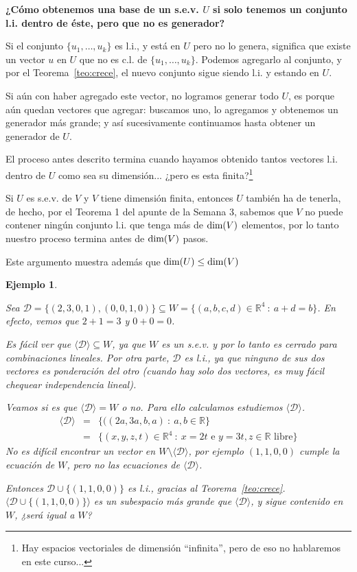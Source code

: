 \documentclass[12pt]{book}
\newtheorem{ejem}{Ejemplo}
\def\R{\mathbb{R}}
\def\D{\mathcal{D}}
\def\dim{\textup{dim}}
\begin{document}
\vspace{.2cm}

{\bf ¿Cómo obtenemos una base de un s.e.v. $U$ si solo tenemos un conjunto l.i. dentro de éste, pero que no es generador?}

Si el conjunto $\{u_1,\dots,u_k\}$ es l.i., y está en $U$ pero no lo genera, significa que existe un vector $u$ en $U$ que no es c.l. de $\{u_1,\dots,u_k\}$.
Podemos agregarlo al conjunto, y por el Teorema~\ref{teo:crece}, el nuevo conjunto sigue siendo l.i. y estando en $U$.

Si aún con haber agregado este vector, no logramos generar todo $U$, es porque aún quedan vectores que agregar: buscamos uno, lo agregamos y obtenemos un generador más grande; y así sucesivamente continuamos hasta obtener un generador de $U$.

El proceso antes descrito termina cuando hayamos obtenido tantos vectores l.i. dentro de $U$ como sea su dimensión... ¿pero es esta finita?\footnote{Hay espacios vectoriales de dimensión ``infinita'', pero de eso no hablaremos en este curso...}

Si $U$ es s.e.v. de $V$ y $V$ tiene dimensión finita, entonces $U$ también ha de tenerla, de hecho, por el Teorema 1 del apunte de la Semana 3, sabemos que $V$ no puede contener ningún conjunto l.i. que tenga más de $\dim(V)$ elementos, por lo tanto nuestro proceso termina antes de $\dim(V)$ pasos.

Este argumento muestra además que $\dim(U)\le\dim(V)$


\begin{ejem}\label{ejem:+1} {\em
  Sea $\D=\{(2,3,0,1),(0,0,1,0)\}\subseteq W=\{(a,b,c,d)\in\R^4\ :\ a+d=b\}$. 
  En efecto, vemos que $2+1=3$ y $0+0=0$.
  
  Es fácil ver que $\langle\D\rangle \subseteq W$, ya que $W$ es un s.e.v. y por lo tanto es cerrado para combinaciones lineales.
  Por otra parte, $\D$ es l.i., ya que ninguno de sus dos vectores es ponderación del otro (cuando hay solo dos vectores, es muy fácil chequear independencia lineal).
  
  Veamos si es que $\langle \D\rangle = W$ o no.
  Para ello calculamos estudiemos $\langle \D\rangle$.
  \begin{eqnarray*}
    \langle\D\rangle&=&\{((2a,3a,b,a)\ :\ a,b\in\R\}\\
    &=& \{(x,y,z,t)\in\R^4\ : \ x=2t\textrm{ e } y=3t, z\in \R \textrm{ libre} \}
  \end{eqnarray*}
No es difícil encontrar un vector en $W\setminus \langle\D\rangle$, por ejemplo $(1,1,0,0)$ cumple la ecuación de $W$, pero no las ecuaciones de $\langle\D\rangle$.
  
Entonces $\D\cup\{(1,1,0,0)\}$ es l.i., gracias al Teorema~\ref{teo:crece}.
  $\langle\D\cup\{(1,1,0,0)\}\rangle$ es un subespacio más grande que $\langle \D\rangle$, y sigue contenido en $W$, ¿será igual a $W$? 
  }
\end{ejem}
\end{document}
